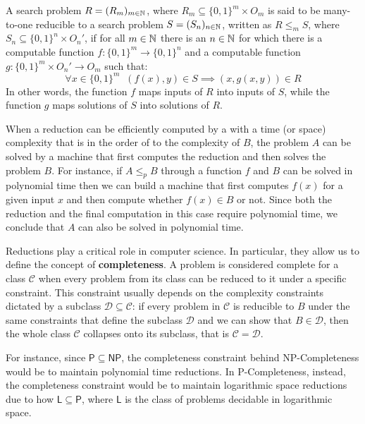 \begin{definition}
 A search problem $R = (R_m)_{m \in \mathbb{N}}$, where $R_m \subseteq \{0,1\}^m \times O_m$ is said to be many-to-one reducible to a search problem $S = (S_n)_{n \in \mathbb{N}}$, written as $R \leq_m S$, where $S_n \subseteq \{0,1\}^n \times O_n'$, if for all $m \in \mathbb{N}$ there is an $n \in \mathbb{N}$ for which there is a computable function $f : \{0,1\}^m \to \{0,1\}^n$ and a computable function $g : \{0,1\}^m \times O_n' \to O_m$ such that:
    \[\forall x \in \{0,1\}^m \;\; (f(x), y) \in S \implies (x, g(x,y)) \in R\]
 In other words, the function $f$ maps inputs of $R$ into inputs of $S$, while the function $g$ maps solutions of $S$ into solutions of $R$. 
\end{definition}

When a reduction can be efficiently computed by a \TM with a time (or space) complexity that is in the order of to the complexity of $B$, the problem $A$ can be solved by a machine that first computes the reduction and then solves the problem $B$. For instance, if $A \leq_p B$ through a function $f$ and $B$ can be solved in polynomial time then we can build a machine that first computes $f(x)$ for a given input $x$ and then compute whether $f(x) \in B$ or not. Since both the reduction and the final computation in this case require polynomial time, we conclude that $A$ can also be solved in polynomial time.

Reductions play a critical role in computer science. In particular, they allow us to define the concept of \textbf{completeness}. A problem is considered complete for a class $\mathcal{C}$ when every problem from its class can be reduced to it under a specific constraint. This constraint usually depends on the complexity constraints dictated by a subclass $\mathcal{D} \subseteq \mathcal{C}$: if every problem in $\mathcal{C}$ is reducible to $B$ under the same constraints that define the subclass $\mathcal{D}$ and we can show that $B \in \mathcal{D}$, then the whole class $\mathcal{C}$ collapses onto its subclass, that is $\mathcal{C} = \mathcal{D}$.

For instance, since $\mathsf{P} \subseteq \mathsf{NP}$, the completeness constraint behind \textsf{NP}-Completeness would be to maintain polynomial time reductions. In \textsf{P}-Completeness, instead, the completeness constraint would be to maintain logarithmic space reductions due to how $\mathsf{L} \subseteq \mathsf{P}$, where $\mathsf{L}$ is the class of problems decidable in logarithmic space.

